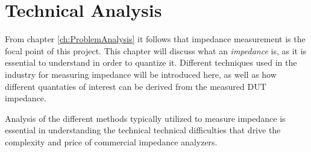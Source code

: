 \chapter{Technical Analysis} \label{ch:TechnicalAnalysis}
From chapter \ref{ch:ProblemAnalysis} it follows that impedance measurement is the focal point of this project. This chapter will discuss what an \textit{impedance} is, as it is essential to understand in order to quantize it. Different techniques used in the industry for measuring impedance will be introduced here, as well as how different quantaties of interest can be derived from the measured DUT impedance. 

Analysis of the different methods typically utilized to measure impedance is essential in understanding the technical technical difficulties that drive the complexity and price of commercial impedance analyzers.

